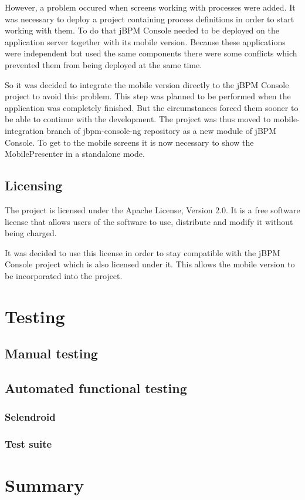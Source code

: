 \documentclass[12pt,oneside,final]{fithesis2}
\begin{document}
However, a problem occured when screens working with processes were added.
It was necessary to deploy a project containing process definitions in order to start working with them.
To do that jBPM Console needed to be deployed on the application server together with its mobile version.
Because these applications were independent but used the same components there were some conflicts which prevented them from being deployed at the same time.

So it was decided to integrate the mobile version directly to the jBPM Console project to avoid this problem.
This step was planned to be performed when the application was completely finished.
But the circumstances forced them sooner to be able to continue with the development.
The project was thus moved to mobile-integration branch of jbpm-console-ng repository\footnotemark{} as a new module of jBPM Console.
To get to the mobile screens it is now necessary to show the MobilePresenter in a standalone mode.

\section{Licensing}
The project is licensed under the Apache License, Version 2.0\footnotemark{}.
It is a free software license that allows users of the software to use, distribute and modify it without being charged.

It was decided to use this license in order to stay compatible with the jBPM Console project which is also licensed under it.
This allows the mobile version to be incorporated into the project.

\chapter{Testing}
\section{Manual testing}
\section{Automated functional testing}
\subsection{Selendroid}
\subsection{Test suite}

\chapter{Summary}

\printbibliography
\end{document}
